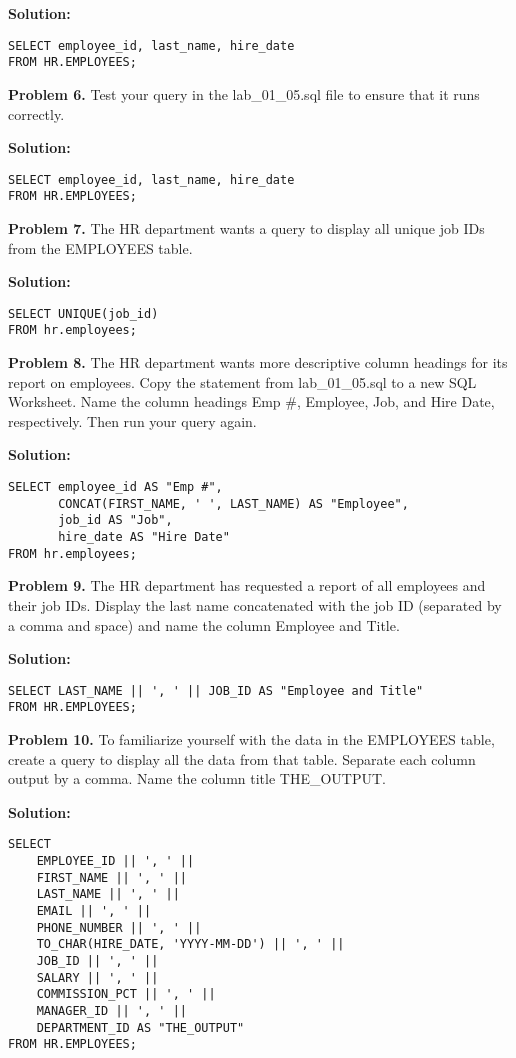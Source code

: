 \documentclass[12pt,a4paper]{article}
\begin{document}
\textbf{Solution:}
\begin{lstlisting}[style=sqlstyle]
SELECT employee_id, last_name, hire_date 
FROM HR.EMPLOYEES;
\end{lstlisting}

\textbf{Problem 6.} Test your query in the lab\_01\_05.sql file to ensure that it runs correctly.

\textbf{Solution:}
\begin{lstlisting}[style=sqlstyle]
SELECT employee_id, last_name, hire_date 
FROM HR.EMPLOYEES;
\end{lstlisting}

\textbf{Problem 7.} The HR department wants a query to display all unique job IDs from the EMPLOYEES table.

\textbf{Solution:}
\begin{lstlisting}[style=sqlstyle]
SELECT UNIQUE(job_id) 
FROM hr.employees;
\end{lstlisting}

\textbf{Problem 8.} The HR department wants more descriptive column headings for its report on employees. Copy the statement from lab\_01\_05.sql to a new SQL Worksheet. Name the column headings Emp \#, Employee, Job, and Hire Date, respectively. Then run your query again.

\textbf{Solution:}
\begin{lstlisting}[style=sqlstyle]
SELECT employee_id AS "Emp #", 
       CONCAT(FIRST_NAME, ' ', LAST_NAME) AS "Employee", 
       job_id AS "Job", 
       hire_date AS "Hire Date" 
FROM hr.employees;
\end{lstlisting}

\textbf{Problem 9.} The HR department has requested a report of all employees and their job IDs. Display the last name concatenated with the job ID (separated by a comma and space) and name the column Employee and Title.

\textbf{Solution:}
\begin{lstlisting}[style=sqlstyle]
SELECT LAST_NAME || ', ' || JOB_ID AS "Employee and Title"
FROM HR.EMPLOYEES;
\end{lstlisting}

\textbf{Problem 10.} To familiarize yourself with the data in the EMPLOYEES table, create a query to display all the data from that table. Separate each column output by a comma. Name the column title THE\_OUTPUT.

\textbf{Solution:}
\begin{lstlisting}[style=sqlstyle]
SELECT
    EMPLOYEE_ID || ', ' ||
    FIRST_NAME || ', ' ||
    LAST_NAME || ', ' ||
    EMAIL || ', ' ||
    PHONE_NUMBER || ', ' ||
    TO_CHAR(HIRE_DATE, 'YYYY-MM-DD') || ', ' ||
    JOB_ID || ', ' ||
    SALARY || ', ' ||
    COMMISSION_PCT || ', ' ||
    MANAGER_ID || ', ' ||
    DEPARTMENT_ID AS "THE_OUTPUT"
FROM HR.EMPLOYEES;
\end{lstlisting}
\end{document}
